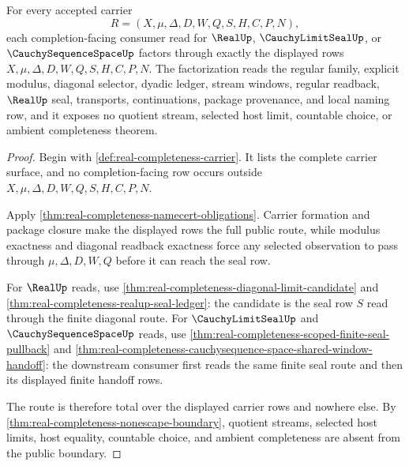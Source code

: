 \begin{theorem}
\label{thm:real-completeness-consumer-route-totality}
For every accepted carrier
$$
R=(X,\mu,\Delta,D,W,Q,S,H,C,P,N),
$$
each completion-facing consumer read for $\RealUp$, $\CauchyLimitSealUp$, or $\CauchySequenceSpaceUp$ factors through exactly the displayed rows $X,\mu,\Delta,D,W,Q,S,H,C,P,N$. The factorization reads the regular family, explicit modulus, diagonal selector, dyadic ledger, stream windows, regular readback, $\RealUp$ seal, transports, continuations, package provenance, and local naming row, and it exposes no quotient stream, selected host limit, countable choice, or ambient completeness theorem.
\end{theorem}
\begin{proof}
Begin with \autoref{def:real-completeness-carrier}. It lists the complete carrier surface, and no completion-facing row occurs outside $X,\mu,\Delta,D,W,Q,S,H,C,P,N$.

Apply \autoref{thm:real-completeness-namecert-obligations}. Carrier formation and package closure make the displayed rows the full public route, while modulus exactness and diagonal readback exactness force any selected observation to pass through $\mu,\Delta,D,W,Q$ before it can reach the seal row.

For $\RealUp$ reads, use \autoref{thm:real-completeness-diagonal-limit-candidate} and \autoref{thm:real-completeness-realup-seal-ledger}: the candidate is the seal row $S$ read through the finite diagonal route. For $\CauchyLimitSealUp$ and $\CauchySequenceSpaceUp$ reads, use \autoref{thm:real-completeness-scoped-finite-seal-pullback} and \autoref{thm:real-completeness-cauchysequence-space-shared-window-handoff}: the downstream consumer first reads the same finite seal route and then its displayed finite handoff rows.

The route is therefore total over the displayed carrier rows and nowhere else. By \autoref{thm:real-completeness-nonescape-boundary}, quotient streams, selected host limits, host equality, countable choice, and ambient completeness are absent from the public boundary.
\end{proof}


